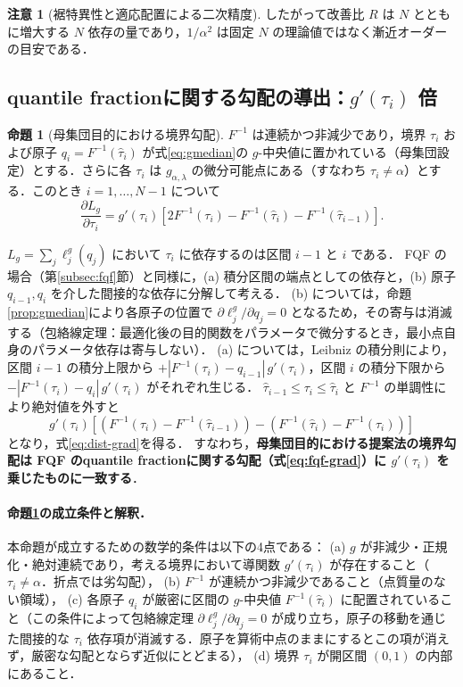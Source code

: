 \documentclass[a4paper,10pt]{jsarticle}
\makeatletter
\theoremstyle{definition}
\newtheorem{proposition}{命題}[section]
\newtheorem{remark}{注意}[section]
\renewenvironment{proof}[1][\proofname]{\par
  \pushQED{\qed}%
  \normalfont \topsep6\p@\@plus6\p@\relax
  \trivlist
  \item[\hskip\labelsep\textbf{#1}]\ignorespaces
}{%
  \popQED\endtrivlist\@endpefalse
}
\renewcommand{\proofname}{証明}
\newcommand{\Finv}{F^{-1}}
\makeatother
\begin{document}
\begin{remark}[裾特異性と適応配置による二次精度]
したがって改善比 $R$ は $N$ とともに増大する $N$ 依存の量であり，$1/\alpha^2$ は固定 $N$ の理論値ではなく漸近オーダーの目安である．
\end{remark}
\subsection{quantile fractionに関する勾配の導出：$g'(\tau_i)$ 倍}
\begin{proposition}[母集団目的における境界勾配]
\label{prop:grad}
$\Finv$ は連続かつ非減少であり，境界 $\tau_i$ および原子 $q_i=\Finv(\hat\tau_i)$ が式\eqref{eq:gmedian}の $g$-中央値に置かれている（母集団設定）とする．さらに各 $\tau_i$ は $g_{\alpha,\lambda}$ の微分可能点にある（すなわち $\tau_i\ne\alpha$）とする．このとき $i=1,\dots,N-1$ について
\begin{equation}
  \frac{\partial L_g}{\partial\tau_i}=g'(\tau_i)\left[2\Finv(\tau_i)-\Finv(\hat\tau_i)-\Finv(\hat\tau_{i-1})\right].
  \label{eq:dist-grad}
\end{equation}
\end{proposition}
\begin{proof}
$L_g=\sum_j\ell_j^g(q_j)$ において $\tau_i$ に依存するのは区間 $i-1$ と $i$ である．
FQF の場合（第\ref{subsec:fqf}節）と同様に，(a) 積分区間の端点としての依存と，(b) 原子 $q_{i-1},q_i$ を介した間接的な依存に分解して考える．
(b) については，命題\ref{prop:gmedian}により各原子の位置で $\partial\ell^g_j/\partial q_j=0$ となるため，その寄与は消滅する（包絡線定理：最適化後の目的関数をパラメータで微分するとき，最小点自身のパラメータ依存は寄与しない）．
(a) については，Leibniz の積分則により，区間 $i-1$ の積分上限から $+|\Finv(\tau_i)-q_{i-1}|\,g'(\tau_i)$，区間 $i$ の積分下限から $-|\Finv(\tau_i)-q_i|\,g'(\tau_i)$ がそれぞれ生じる．
$\hat\tau_{i-1}\le\tau_i\le\hat\tau_i$ と $\Finv$ の単調性により絶対値を外すと
\begin{equation*}
  g'(\tau_i)\left[\left(\Finv(\tau_i)-\Finv(\hat\tau_{i-1})\right)-\left(\Finv(\hat\tau_i)-\Finv(\tau_i)\right)\right]
\end{equation*}
となり，式\eqref{eq:dist-grad}を得る．
\end{proof}
すなわち，\textbf{母集団目的における提案法の境界勾配は FQF のquantile fractionに関する勾配（式\eqref{eq:fqf-grad}）に $g'(\tau_i)$ を乗じたものに一致する}．

\paragraph{命題\ref{prop:grad}の成立条件と解釈．}
本命題が成立するための数学的条件は以下の4点である：
(a) $g$ が非減少・正規化・絶対連続であり，考える境界において導関数 $g'(\tau_i)$ が存在すること（$\tau_i\ne\alpha$．折点では劣勾配），
(b) $\Finv$ が連続かつ非減少であること（点質量のない領域），
(c) 各原子 $q_i$ が厳密に区間の $g$-中央値 $\Finv(\hat\tau_i)$ に配置されていること（この条件によって包絡線定理 $\partial\ell_j^g/\partial q_j=0$ が成り立ち，原子の移動を通じた間接的な $\tau_i$ 依存項が消滅する．原子を算術中点のままにするとこの項が消えず，厳密な勾配とならず近似にとどまる），
(d) 境界 $\tau_i$ が開区間 $(0,1)$ の内部にあること．
\end{document}
